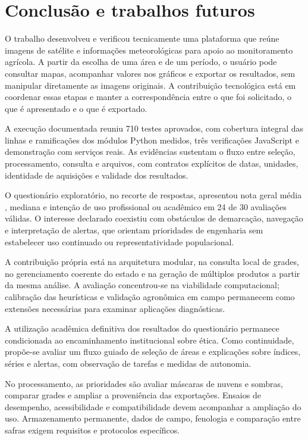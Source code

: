 \section{Conclusão e trabalhos futuros}\label{chap:conclusao-final}

O trabalho desenvolveu e verificou tecnicamente uma plataforma que reúne imagens de satélite e informações meteorológicas para apoio ao monitoramento agrícola. A partir da escolha de uma área e de um período, o usuário pode consultar mapas, acompanhar valores nos gráficos e exportar os resultados, sem manipular diretamente as imagens originais. A contribuição tecnológica está em coordenar essas etapas e manter a correspondência entre o que foi solicitado, o que é apresentado e o que é exportado.

A execução documentada reuniu 710 testes aprovados, com cobertura integral das linhas e ramificações dos módulos Python medidos, três verificações JavaScript e demonstração com serviços reais. As evidências sustentam o fluxo entre seleção, processamento, consulta e arquivos, com contratos explícitos de datas, unidades, identidade de aquisições e validade dos resultados.

O questionário exploratório, no recorte de \UsuariosN{} respostas, apresentou nota geral média \UsuariosMedia{}, mediana \UsuariosMediana{} e intenção de uso profissional ou acadêmico em 24 de 30 avaliações válidas. O interesse declarado coexistiu com obstáculos de demarcação, navegação e interpretação de alertas, que orientam prioridades de engenharia sem estabelecer uso continuado ou representatividade populacional.

A contribuição própria está na arquitetura modular, na consulta local de grades, no gerenciamento coerente do estado e na geração de múltiplos produtos a partir da mesma análise. A avaliação concentrou-se na viabilidade computacional; calibração das heurísticas e validação agronômica em campo permanecem como extensões necessárias para examinar aplicações diagnósticas.

A utilização acadêmica definitiva dos resultados do questionário permanece condicionada ao encaminhamento institucional sobre ética. Como continuidade, propõe-se avaliar um fluxo guiado de seleção de áreas e explicações sobre índices, séries e alertas, com observação de tarefas e medidas de autonomia.

No processamento, as prioridades são avaliar máscaras de nuvens e sombras, comparar grades e ampliar a proveniência das exportações. Ensaios de desempenho, acessibilidade e compatibilidade devem acompanhar a ampliação do uso. Armazenamento permanente, dados de campo, fenologia e comparação entre safras exigem requisitos e protocolos específicos.

